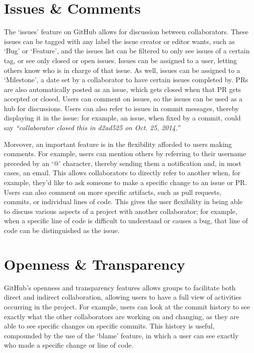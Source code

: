 \section{Issues \& Comments}
The `issues' feature on GitHub allows for discussion between collaborators. These issues can be tagged with any label the issue creator or editor wants, such as `Bug' or `Feature', and the issues list can be filtered to only see issues of a certain tag, or see only closed or open issues. Issues can be assigned to a user, letting others know who is in charge of that issue. As well, issues can be assigned to a `Milestone', a date set by a collaborator to have certain issues completed by. PRs are also automatically posted as an issue, which gets closed when that PR gets accepted or closed. Users can comment on issues, so the issues can be used as a hub for discussions. Users can also refer to issues in commit messages, thereby displaying it in the issue: for example, an issue, when fixed by a commit, could say \textit{``collaborator closed this in d2ad525 on Oct. 25, 2014.''}

Moreover, an important feature is in the flexibility afforded to users making comments. For example, users can mention others by referring to their username preceded by an `@' character, thereby sending them a notification and, in most cases, an email. This allows collaborators to directly refer to another when, for example, they'd like to ask someone to make a specific change to an issue or PR. Users can also comment on more specific artifacts, such as pull requests, commits, or individual lines of code. This gives the user flexibility in being able to discuss various aspects of a project with another collaborator; for example, when a specific line of code is difficult to understand or causes a bug, that line of code can be distinguished as the issue.

\section{Openness \& Transparency}
GitHub's openness and transparency features allows groups to facilitate both direct and indirect collaboration, allowing users to have a full view of activities occurring in the project. For example, users can look at the commit history to see exactly what the other collaborators are working on and changing, as they are able to see specific changes on specific commits. This history is useful, compounded by the use of the `blame' feature, in which a user can see exactly who made a specific change or line of code. %

